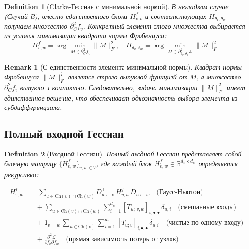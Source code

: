 \documentclass[11pt]{article}
\newtheorem{remark}{Remark}
\newtheorem{definition}{Definition}
\newcommand{\Ch}{\mathrm{Ch}} %
\begin{document}
\begin{definition}[Clarke-Гессиан с минимальной нормой]
  В негладком случае (Случай B), вместо единственного блока $H^f_{v,v}$ и соответствующих
  $H_{\theta_v,\theta_w}$ получаем множество $\partial_C^2f_v$. Конкретный элемент этого множества выбирается
  из условия минимизации квадрата нормы Фробениуса:
  \[
    H^f_{v,w}
    = \arg\min_{M\in\partial_C^2 f_v}\|M\|_F^2,
    \quad
    H_{\theta_v,\theta_w}
    = \arg\min_{M\in\partial^2_{\theta_v,\theta_w}\!\mathcal L}\|M\|_F^2.
  \]
\end{definition}

\begin{remark}[О единственности элемента минимальной нормы]
  Квадрат нормы Фробениуса $\|M\|_F^2$ является строго выпуклой функцией от $M$, а множество $\partial_C^2
  f_v$ выпукло и компактно. Следовательно, задача минимизации $\|M\|_F^2$ имеет единственное решение, что
  обеспечивает однозначность выбора элемента из субдифференциала.
\end{remark}

\subsection{Полный входной Гессиан}

\begin{definition}[Входной Гессиан]
  Полный входной Гессиан представляет собой блочную матрицу $\{H^f_{v,w}\}_{v,w\in V}$, где каждый блок
  $H^f_{v,w}\in\mathbb{R}^{d_v\times d_w}$ определяется рекурсивно:
\end{definition}

\begin{equation}\label{eq:Hf}
  \boxed{
    \begin{split}
      H^f_{v,w}
      &=
      \sum_{u\in\Ch(v)\cap\Ch(w)}
      D_{u\gets v}^\top\,H^f_{u,u}\,D_{u\gets w}
      \quad\text{(Гаусс-Ньютон)}\\
      &\quad+
      \sum_{u\in\Ch(v)\cap\Ch(w)}
      \sum_{i=1}^{d_u}
      [T_{u;\,v,w}]_{i,\bullet,\bullet}\,\delta_{u,i}
      \quad\text{(смешанные входы)}\\
      &\quad+
      \mathbf{1}_{v=w}\,
      \sum_{u\in\Ch(v)}
      \sum_{i=1}^{d_u}
      [T_{u;v}]_{i,\bullet,\bullet}\,\delta_{u,i}
      \quad\text{(чистые по одному входу)}\\
      &\quad+
      \frac{\partial^2 \mathcal{L}}{\partial f_v \partial f_w}
      \quad\text{(прямая зависимость потерь от узлов)}
    \end{split}
  }
\end{equation}
\end{document}
